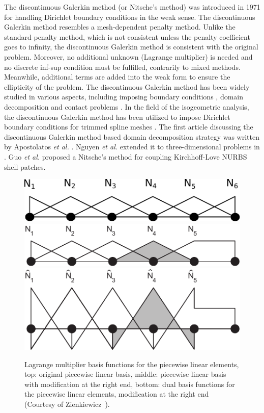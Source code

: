 The discontinuous Galerkin method (or Nitsche's method) was introduced in 1971 \cite{nitsche_uber_1971} for handling Dirichlet boundary conditions in the weak sense. The discontinuous Galerkin method resembles a mesh-dependent penalty method. Unlike the standard penalty method, which is not consistent unless the penalty coefficient goes to infinity, the discontinuous Galerkin method is consistent with the original problem. Moreover, no additional unknown (Lagrange multiplier) is needed and no discrete inf-sup condition must be fulfilled, contrarily to mixed methods. Meanwhile, additional terms are added into the weak form to ensure the ellipticity of the problem. The discontinuous Galerkin method has been widely studied in various aspects, including imposing boundary conditions \cite{hansbo_nitsches_2005}, domain decomposition \cite{becker_finite_2003} and contact problems \cite{chouly_symmetric_2015}. In the field of the isogeometric analysis, the discontinuous Galerkin method has been utilized to impose Dirichlet boundary conditions for trimmed spline meshes \cite{embar_imposing_2010}. The first article discussing the discontinuous Galerkin method based domain decomposition strategy was written by Apostolatos \textit{et al.} \cite{apostolatos_nitsche-type_2014}. Nguyen \textit{et al.} extended it to three-dimensional problems in \cite{nguyen_nitsches_2014}. Guo \textit{et al.} \cite{guo_nitsches_2015} proposed a Nitsche's method for coupling Kirchhoff-Love NURBS shell patches.\par

\begin{figure}
  \centering
  \includegraphics[width=.7\linewidth]{original_basis}\\
  \vspace{1em}
  \includegraphics[width=.7\linewidth]{mortar_basis}\\
  \vspace{1em}
  \includegraphics[width=.7\linewidth]{dual_mortar_basis}
  \caption{Lagrange multiplier basis functions for the piecewise linear elements, top: original piecewise linear basis, middle: piecewise linear basis with modification at the right end, bottom: dual basis functions for the piecewise linear elements, modification at the right end (Courtesy of Zienkiewicz~\cite{zienkiewicz1977finite}).}\label{fig:mortar_basis}
\end{figure}

